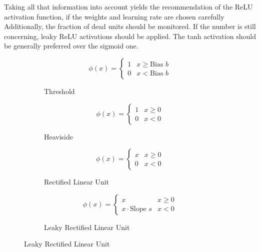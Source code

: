 Taking all that information into account yields the recommendation of the ReLU activation function, if the weights and learning rate are chosen carefully
Additionally, the fraction of dead units should be monitored.
If the number is still concerning, leaky ReLU activations should be applied.
The tanh activation should be generally preferred over the sigmoid one.

\begin{figure}
	\setlength{}
	\setlength{}
	\centering
	\begin{subfigure}{.5\textwidth}
		\centering
		
		\begin{equation*}
		\phi(x) =
		\begin{cases}
		1 & x \geq \text{Bias $b$} \\
		0 & x < \text{Bias $b$}
		\end{cases}
		\end{equation*}
		\caption{Threshold}
		\label{fig:threshold-activation}
	\end{subfigure}%
	\hfill
	\begin{subfigure}{.5\textwidth}
		\centering
		
		\begin{equation*}
		\phi(x) =
		\begin{cases}
		1 & x \geq 0 \\
		0 & x < 0
		\end{cases}
		\end{equation*}
		\caption{Heaviside}
		\label{fig:heaviside-activation}
	\end{subfigure}
	
	\begin{subfigure}{.5\textwidth}
		\centering
		
		\begin{equation*}
		\phi(x) =
		\begin{cases}
		x & x \geq 0 \\
		0 & x < 0
		\end{cases}
		\end{equation*}
		\caption{Rectified Linear Unit}
		\label{fig:relu-activation}
	\end{subfigure}%
	\hfill
	\begin{subfigure}{.5\textwidth}
		\centering
		
		\begin{equation*}
		\phi(x) =
		\begin{cases}
		x & x \geq 0 \\
		x\cdot \text{Slope $s$} & x < 0
		\end{cases}
		\end{equation*}
		\caption{Leaky Rectified Linear Unit}
		\label{fig:leakyrelu-activation}
	\end{subfigure}
	

\end{figure}

